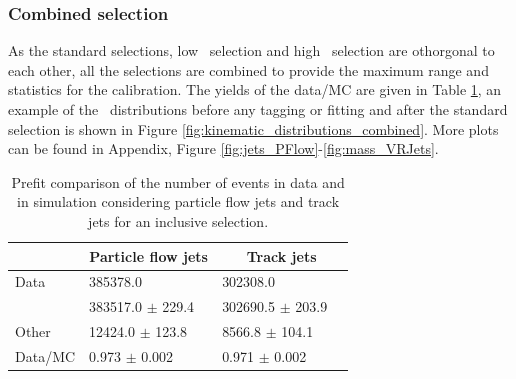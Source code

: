 \documentclass[letterpaper,12pt]{article}
\begin{document}
\subsubsection{Combined selection}
\label{combined_selection}
As the standard selections, low \pt\ selection and high \pt\ selection are othorgonal 
to each other, all the selections are combined to provide the maximum range 
and statistics for the calibration. 
The yields of the data/MC are given in Table \ref{tab:yields_combined}, 
an example of the \pt\ distributions before any tagging or fitting and 
after the standard selection is shown in Figure \ref{fig:kinematic_distributions_combined}. More plots 
can be found in Appendix, Figure \ref{fig:jets_PFlow}-\ref{fig:mass_VRJets}.
\begin{table}[!b]
	\centering
	\small
	\setlength\tabcolsep{5pt} 
	\begin{tabular}{|l | ll | ll |}
	\hline
	& \multicolumn{2}{c|}{Particle flow jets} & \multicolumn{2}{c|}{Track jets} \\
	\hline
	Data          &    385378.0                  &        &   302308.0              &     \\  
	\ttbar\         &    383517.0 $\pm$      229.4 &        &   302690.5 $\pm$      203.9 &   \\
	Other         &     12424.0 $\pm$      123.8 &        &     8566.8 $\pm$      104.1 &   \\
	Data/MC       &    0.973 $\pm$ 0.002         &        &  0.971 $\pm$ 0.002  &           \\
	\hline

	\end{tabular}
	\vspace{0.2cm}
	\caption{Prefit comparison of the number of events in data and in 
	simulation considering particle flow jets and track jets for an inclusive
	selection.}
	\label{tab:yields_combined}
	\end{table}
\end{document}
